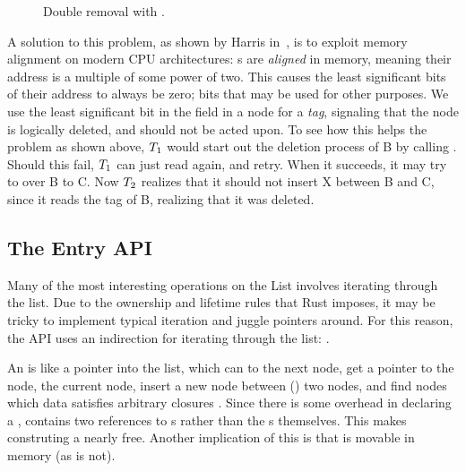 \begin{figure}[ht]
\centering

\caption{Double removal with \label{fig:list-remove}.}
\end{figure}

A solution to this problem, as shown by Harris in~\cite{michael2002high}, is to exploit memory
alignment on modern CPU architectures: s are \emph{aligned} in memory, meaning their
address is a multiple of some power of two. This causes the least significant bits of their address
to always be zero; bits that may be used for other purposes. We use the least significant bit in
the  field in a node for a \emph{tag}, signaling that the node is logically deleted,
and should not be acted upon. To see how this helps the problem as shown above, $T\sb{1}$ would
start out the deletion process of B by calling . Should this
fail, $T\sb{1}$ can just read  again, and retry. When it succeeds, it may try to
  over B to C. Now $T\sb{2}$ realizes that it should not insert X between B
and C, since it reads the tag of B, realizing that it was deleted.


\subsection{The Entry API}

Many of the most interesting operations on the List involves iterating through the list. Due to the
ownership and lifetime rules that Rust imposes, it may be tricky to implement typical iteration
and juggle pointers around. For this reason, the API uses an indirection for iterating through the
list: .

\begin{figure}[ht]

\end{figure}

An  is like a pointer into the list, which can  to the next node, get a
pointer to the  node,  the current node, insert a new node between
() two nodes, and find nodes which data satisfies arbitrary closures
.  Since there is some overhead in declaring a , 
contains two references to s rather than the s themselves. This makes
construting a  nearly free.  Another implication of this is that  is
movable in memory (as  is not).

